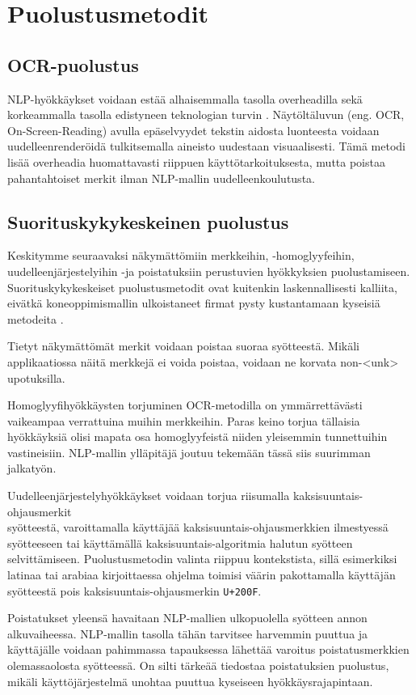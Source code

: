 \chapter{Puolustusmetodit\label{results}}
\section{OCR-puolustus}
NLP-hyökkäykset voidaan estää alhaisemmalla tasolla overheadilla sekä korkeammalla tasolla edistyneen teknologian turvin \citep{boucher2021bad}. Näytöltäluvun (eng. OCR, On-Screen-Reading) avulla epäselvyydet tekstin aidosta luonteesta voidaan uudelleenrenderöidä tulkitsemalla aineisto uudestaan visuaalisesti. Tämä metodi lisää overheadia huomattavasti riippuen käyttötarkoituksesta, mutta poistaa pahantahtoiset merkit ilman NLP-mallin uudelleenkoulutusta.

\section{Suorituskykykeskeinen puolustus}
Keskitymme seuraavaksi näkymättömiin merkkeihin, -homoglyyfeihin, \-uudelleenjärjestelyihin -ja poistatuksiin perustuvien hyökkyksien puolustamiseen. Suorituskykykeskeiset puolustusmetodit ovat kuitenkin laskennallisesti kalliita, eivätkä koneoppimismallin ulkoistaneet firmat pysty kustantamaan kyseisiä metodeita \citep{https://doi.org/10.48550/arxiv.1911.07399}.

Tietyt näkymättömät merkit voidaan poistaa suoraa syötteestä. Mikäli applikaatiossa näitä merkkejä ei voida poistaa, voidaan ne korvata non-<unk> upotuksilla.

Homoglyyfihyökkäysten torjuminen OCR-metodilla on ymmärrettävästi vaikeampaa verrattuina muihin merkkeihin. Paras keino torjua tällaisia hyökkäyksiä olisi mapata osa homoglyyfeistä niiden yleisemmin tunnettuihin vastineisiin. NLP-mallin ylläpitäjä joutuu tekemään tässä siis suurimman jalkatyön.

Uudelleenjärjestelyhyökkäykset voidaan torjua riisumalla kaksisuuntais-ohjausmerkit\\syötteestä, varoittamalla käyttäjää kaksisuuntais-ohjausmerkkien ilmestyessä syötteeseen tai käyttämällä kaksisuuntais-algoritmia halutun syötteen selvittämiseen. Puolustusmetodin valinta riippuu kontekstista, sillä esimerkiksi latinaa tai arabiaa kirjoittaessa ohjelma toimisi väärin pakottamalla käyttäjän syötteestä pois kaksisuuntais-ohjausmerkin \texttt{U+200F}.

Poistatukset yleensä havaitaan NLP-mallien ulkopuolella syötteen annon alkuvaiheessa. NLP-mallin tasolla tähän tarvitsee harvemmin puuttua ja käyttäjälle voidaan pahimmassa tapauksessa lähettää varoitus poistatusmerkkien olemassaolosta syötteessä. On silti tärkeää tiedostaa poistatuksien puolustus, mikäli käyttöjärjestelmä unohtaa puuttua kyseiseen hyökkäysrajapintaan.